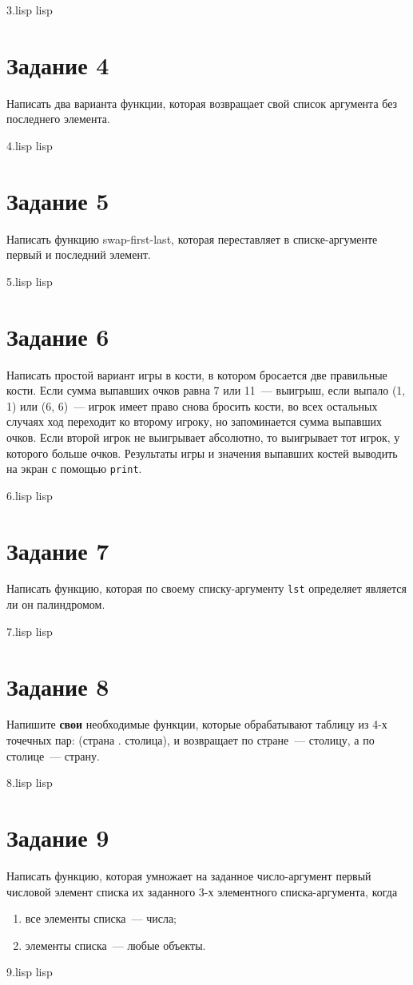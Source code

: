{3.lisp}
{lisp}
{}

\section{Задание 4}
Написать два варианта функции, которая возвращает свой список аргумента без последнего элемента.

{4.lisp}
{lisp}
{}

\section{Задание 5}
Написать функцию swap-first-last, которая переставляет в списке-аргументе первый и последний элемент.

{5.lisp}
{lisp}
{}

\section{Задание 6}
Написать простой вариант игры в кости, в котором бросается две правильные кости. Если сумма выпавших очков равна 7 или 11~--- выигрыш, если выпало (1, 1) или (6, 6)~--- игрок имеет право снова бросить кости, во всех остальных случаях ход переходит ко второму игроку, но запоминается сумма выпавших очков. Если второй игрок не выигрывает абсолютно, то выигрывает тот игрок, у которого больше очков. Результаты игры и значения выпавших костей выводить на экран с помощью \texttt{print}.

{6.lisp}
{lisp}
{}

\section{Задание 7}
Написать функцию, которая по своему списку-аргументу \texttt{lst} определяет является ли он палиндромом.

{7.lisp}
{lisp}
{}

\section{Задание 8}
Напишите \textbf{свои} необходимые функции, которые обрабатывают таблицу из 4-х точечных пар: (страна . столица), и возвращает по стране~--- столицу, а по столице~--- страну.

{8.lisp}
{lisp}
{}

\section{Задание 9}
Написать функцию, которая умножает на заданное число-аргумент первый числовой элемент списка их заданного 3-х элементного списка-аргумента, когда
\begin{enumerate}
	\item все элементы списка~--- числа;
	\item элементы списка~--- любые объекты.
\end{enumerate}

{9.lisp}
{lisp}
{}
